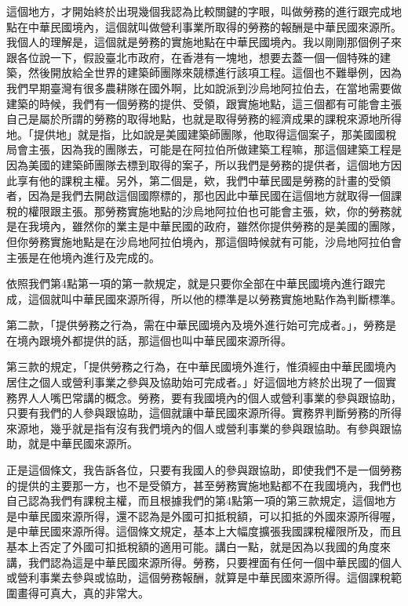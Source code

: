\documentclass[oneside,sub3section]{ctexbook}
\begin{document}
這個地方，才開始終於出現幾個我認為比較關鍵的字眼，叫做勞務的進行跟完成地點在中華民國境內，這個就叫做營利事業所取得的勞務的報酬是中華民國來源所。我個人的理解是，這個就是勞務的實施地點在中華民國境內。我以剛剛那個例子來跟各位說一下，假設臺北市政府，在香港有一塊地，想要去蓋一個一個特殊的建築，然後開放給全世界的建築師團隊來競標進行該項工程。這個也不難舉例，因為我們早期臺灣有很多農耕隊在國外啊，比如說派到沙烏地阿拉伯去，在當地需要做建築的時候，我們有一個勞務的提供、受領，跟實施地點，這三個都有可能會主張自己是屬於所謂的勞務的取得地點，也就是取得勞務的經濟成果的課稅來源地所得地。「提供地」就是指，比如說是美國建築師團隊，他取得這個案子，那美國國稅局會主張，因為我的團隊去，可能是在阿拉伯所做建築工程嘛，那這個建築工程是因為美國的建築師團隊去標到取得的案子，所以我們是勞務的提供者，這個地方因此享有他的課稅主權。另外，第二個是，欸，我們中華民國是勞務的計畫的受領者，因為是我們去開啟這個國際標的，那也因此中華民國在這個地方就取得一個課稅的權限跟主張。那勞務實施地點的沙烏地阿拉伯也可能會主張，欸，你的勞務就是在我境內，雖然你的業主是中華民國的政府，雖然你提供勞務的是美國的團隊，但你勞務實施地點是在沙烏地阿拉伯境內，那這個時候就有可能，沙烏地阿拉伯會主張是在他境內進行及完成的。

依照我們第4點第一項的第一款規定，就是只要你全部在中華民國境內進行跟完成，這個就叫中華民國來源所得，所以他的標準是以勞務實施地點作為判斷標準。

第二款，「提供勞務之行為，需在中華民國境內及境外進行始可完成者。」，勞務是在境內跟境外都提供的話，那這個也叫中華民國來源所得。

第三款的規定，「提供勞務之行為，在中華民國境外進行，惟須經由中華民國境內居住之個人或營利事業之參與及協助始可完成者。」好這個地方終於出現了一個實務界人人嘴巴常講的概念。勞務，要有我國境內的個人或營利事業的參與跟協助，只要有我們的人參與跟協助，這個就讓中華民國來源所得。實務界判斷勞務的所得來源地，幾乎就是指有沒有我們境內的個人或營利事業的參與跟協助。有參與跟協助，就是中華民國來源所。

正是這個條文，我告訴各位，只要有我國人的參與跟協助，即使我們不是一個勞務的提供的主要那一方，也不是受領方，甚至勞務實施地點都不在我國境內，我們也自己認為我們有課稅主權，而且根據我們的第4點第一項的第三款規定，這個地方是中華民國來源所得，還不認為是外國可扣抵稅額，可以扣抵的外國來源所得喔，是中華民國來源所得。這個條文規定，基本上大幅度擴張我國課稅權限所及，而且基本上否定了外國可扣抵稅額的適用可能。講白一點，就是因為以我國的角度來講，我們認為這是中華民國來源所得。勞務，只要裡面有任何一個中華民國的個人或營利事業去參與或協助，這個勞務報酬，就算是中華民國來源所得。這個課稅範圍畫得可真大，真的非常大。
\end{document}
